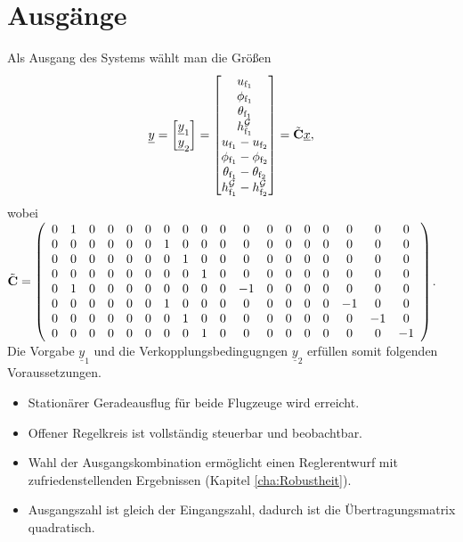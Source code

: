 \section{Ausgänge}
Als Ausgang des Systems wählt man die Grö{\ss}en
\begin{equation}
\underline{y} = \begin{bmatrix} \underline{y}_\mathrm{1}\\\underline{y}_\mathrm{2}  \end{bmatrix} = \begin{bmatrix} u_\mathrm{f_1}\\\phi_\mathrm{f_1}\\ \theta_\mathrm{f_1}\\ h^\mathcal{G}_\mathrm{f_1}\\u_\mathrm{f_1}-u_\mathrm{f_2}\\ \phi_\mathrm{f_1} -\phi_\mathrm{f_2}\\\theta_\mathrm{f_1}-\theta_\mathrm{f_2}\\ h^\mathcal{G}_\mathrm{f_1} - h^\mathcal{G}_\mathrm{f_2} \end{bmatrix} = \Tilde{\textbf{C}}\underline{x},
\end{equation}
wobei\\
$ \Tilde{\textbf{C}} =  \left(\begin{array}{cccccccccccccccccc} 0 & 1 & 0 & 0 & 0 & 0 & 0 & 0 & 0 & 0 & 0 & 0 & 0 & 0 & 0 & 0 & 0 & 0\\ 0 & 0 & 0 & 0 & 0 & 0 & 1 & 0 & 0 & 0 & 0 & 0 & 0 & 0 & 0 & 0 & 0 & 0\\ 0 & 0 & 0 & 0 & 0 & 0 & 0 & 1 & 0 & 0 & 0 & 0 & 0 & 0 & 0 & 0 & 0 & 0\\ 0 & 0 & 0 & 0 & 0 & 0 & 0 & 0 & 1 & 0 & 0 & 0 & 0 & 0 & 0 & 0 & 0 & 0\\ 0 & 1 & 0 & 0 & 0 & 0 & 0 & 0 & 0 & 0 & -1 & 0 & 0 & 0 & 0 & 0 & 0 & 0\\ 0 & 0 & 0 & 0 & 0 & 0 & 1 & 0 & 0 & 0 & 0 & 0 & 0 & 0 & 0 & -1 & 0 & 0\\ 0 & 0 & 0 & 0 & 0 & 0 & 0 & 1 & 0 & 0 & 0 & 0 & 0 & 0 & 0 & 0 & -1 & 0\\ 0 & 0 & 0 & 0 & 0 & 0 & 0 & 0 & 1 & 0 & 0 & 0 & 0 & 0 & 0 & 0 & 0 & -1 \end{array}\right)$.
\newline
Die Vorgabe $\underline{y}_\mathrm{1}$ und die Verkopplungsbedingugngen $\underline{y}_\mathrm{2}$ erfüllen somit folgenden Voraussetzungen.
\begin{itemize}
\item Stationärer Geradeausflug für beide Flugzeuge wird erreicht.
\item Offener Regelkreis ist vollständig steuerbar und beobachtbar.
\item Wahl der Ausgangskombination ermöglicht einen Reglerentwurf mit zufriedenstellenden Ergebnissen (Kapitel \ref{cha:Robustheit}).
\item Ausgangszahl ist gleich der Eingangszahl, dadurch ist die Übertragungsmatrix quadratisch.
\end{itemize}

